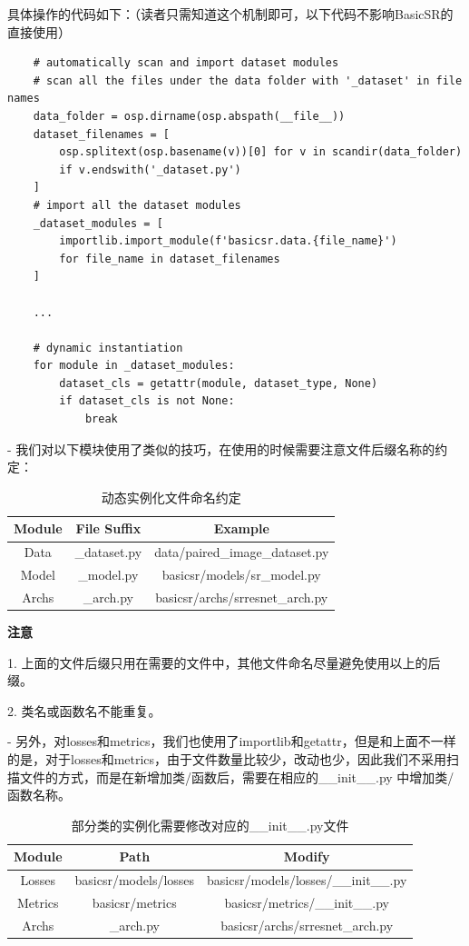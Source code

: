 \documentclass[../main.tex]{subfiles}
\begin{document}
    具体操作的代码如下：（读者只需知道这个机制即可，以下代码不影响BasicSR的直接使用）
	\begin{verbatim}
    # automatically scan and import dataset modules
    # scan all the files under the data folder with '_dataset' in file names
    data_folder = osp.dirname(osp.abspath(__file__))
    dataset_filenames = [
        osp.splitext(osp.basename(v))[0] for v in scandir(data_folder)
        if v.endswith('_dataset.py')
    ]
    # import all the dataset modules
    _dataset_modules = [
        importlib.import_module(f'basicsr.data.{file_name}')
        for file_name in dataset_filenames
    ]
    
    ...
    
    # dynamic instantiation
    for module in _dataset_modules:
        dataset_cls = getattr(module, dataset_type, None)
        if dataset_cls is not None:
            break
	\end{verbatim}
	
	- 我们对以下模块使用了类似的技巧，在使用的时候需要注意文件后缀名称的约定：
	\begin{table}[h]
	\centering
    \begin{tabular}{|c|c|c|}
    \hline
    \textbf{Module} & \textbf{File Suffix} & \textbf{Example} \\ \hline
    Data & \_dataset.py & data/paired\_image\_dataset.py \\ \hline
    Model & \_model.py & basicsr/models/sr\_model.py \\ \hline
    Archs & \_arch.py & basicsr/archs/srresnet\_arch.py \\ \hline
    \end{tabular}
    \caption{动态实例化文件命名约定}
    \end{table}
    
    \begin{hl} %
	\textbf{注意}
	
	1. 上面的文件后缀只用在需要的文件中，其他文件命名尽量避免使用以上的后缀。
	
	2. 类名或函数名不能重复。
    \end{hl}
    
    - 另外，对losses和metrics，我们也使用了importlib和getattr，但是和上面不一样的是，对于losses和metrics，由于文件数量比较少，改动也少，因此我们不采用扫描文件的方式，而是在新增加类/函数后，需要在相应的\_\_init\_\_.py 中增加类/函数名称。
    \begin{table}[h]
    \centering
    \begin{tabular}{|c|c|c|}
    \hline
    \textbf{Module} & \textbf{Path} & \textbf{Modify} \\ \hline
    Losses & basicsr/models/losses & basicsr/models/losses/\_\_init\_\_.py \\ \hline
    Metrics & basicsr/metrics & basicsr/metrics/\_\_init\_\_.py \\ \hline
    Archs & \_arch.py & basicsr/archs/srresnet\_arch.py \\ \hline
    \end{tabular}
    \caption{部分类的实例化需要修改对应的\_\_init\_\_.py文件}
    \end{table}
    
\end{document}
